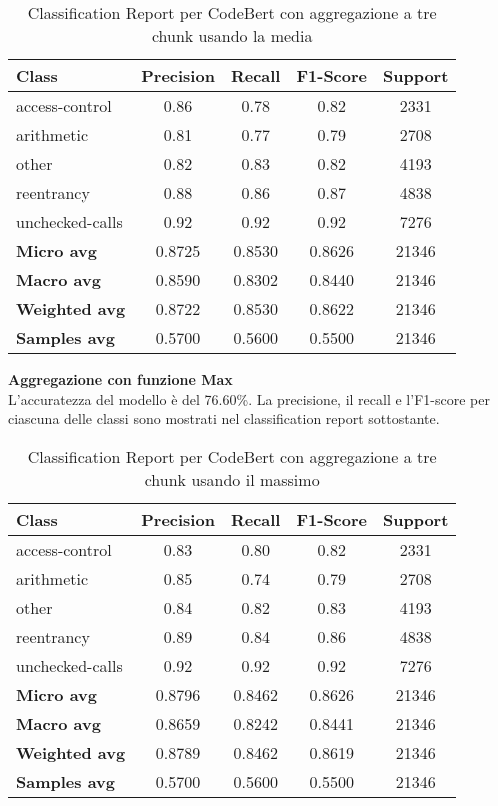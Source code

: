 \documentclass[../../Thesis.tex]{subfiles}
\begin{document}
    \begin{table}[H]
        \centering
        \small
        \begin{tabular}{lcccc}
        \hline
        \textbf{Class} & \textbf{Precision} & \textbf{Recall} & \textbf{F1-Score} & \textbf{Support} \\
        \hline
        access-control & 0.86 & 0.78 & 0.82 & 2331 \\
        arithmetic & 0.81 & 0.77 & 0.79 & 2708 \\
        other & 0.82 & 0.83 & 0.82 & 4193 \\
        reentrancy & 0.88 & 0.86 & 0.87 & 4838 \\
        unchecked-calls & 0.92 & 0.92 & 0.92 & 7276 \\
        \hline
        \textbf{Micro avg} & 0.8725 & 0.8530 & 0.8626 & 21346 \\
        \textbf{Macro avg} & 0.8590 & 0.8302 & 0.8440 & 21346 \\
        \textbf{Weighted avg} & 0.8722 & 0.8530 & 0.8622 & 21346 \\
        \textbf{Samples avg} & 0.5700 & 0.5600 & 0.5500 & 21346 \\
        \hline
        \end{tabular}
        \caption{Classification Report per CodeBert con aggregazione a tre chunk usando la media}
    \end{table}
        
        
    
\textbf{Aggregazione con funzione Max}\\
L'accuratezza del modello è del 76.60\%. La precisione, il recall e l'F1-score per ciascuna delle classi sono mostrati nel classification report sottostante.
\begin{table}[H]
\centering
\small
\begin{tabular}{lcccc}
\hline
\textbf{Class} & \textbf{Precision} & \textbf{Recall} & \textbf{F1-Score} & \textbf{Support} \\
\hline
access-control & 0.83 & 0.80 & 0.82 & 2331 \\
arithmetic & 0.85 & 0.74 & 0.79 & 2708 \\
other & 0.84 & 0.82 & 0.83 & 4193 \\
reentrancy & 0.89 & 0.84 & 0.86 & 4838 \\
unchecked-calls & 0.92 & 0.92 & 0.92 & 7276 \\
\hline
\textbf{Micro avg} & 0.8796 & 0.8462 & 0.8626 & 21346 \\
\textbf{Macro avg} & 0.8659 & 0.8242 & 0.8441 & 21346 \\
\textbf{Weighted avg} & 0.8789 & 0.8462 & 0.8619 & 21346 \\
\textbf{Samples avg} & 0.5700 & 0.5600 & 0.5500 & 21346 \\
\hline
\end{tabular}
\caption{Classification Report per CodeBert con aggregazione a tre chunk usando il massimo}
\end{table}
\end{document}
